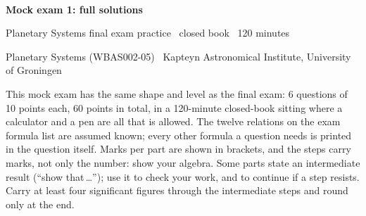 
\newcommand{\pts}[1]{{\normalfont\small\bfseries\color{ipsAccent}[#1~pts]}\enspace}

\thispagestyle{fancy}

\begingroup
\noindent{\color{ipsAccent}\rule{\linewidth}{1.2pt}}\\[8pt]
{\LARGE\bfseries\color{ipsPrimary} Mock exam 1\ifipssolutions: full solutions\fi\par}
\vskip7pt
{\normalsize\color{ipsAccent} Planetary Systems final exam practice \textbullet\ closed book \textbullet\ 120 minutes\par}
\vskip3pt
{\footnotesize Planetary Systems (WBAS002-05) \textbullet\ Kapteyn Astronomical Institute, University of Groningen\par}
\vskip7pt
\noindent{\color{ipsAccent}\rule{\linewidth}{0.6pt}}
\vskip10pt
\endgroup

This mock exam has the same shape and level as the final exam: 6 questions of 10 points each, 60 points in total, in a 120-minute closed-book sitting where a calculator and a pen are all that is allowed.
The twelve relations on the exam formula list are assumed known; every other formula a question needs is printed in the question itself.
Marks per part are shown in brackets, and the steps carry marks, not only the number: show your algebra.
Some parts state an intermediate result (``show that\,\ldots''); use it to check your work, and to continue if a step resists.
Carry at least four significant figures through the intermediate steps and round only at the end.

